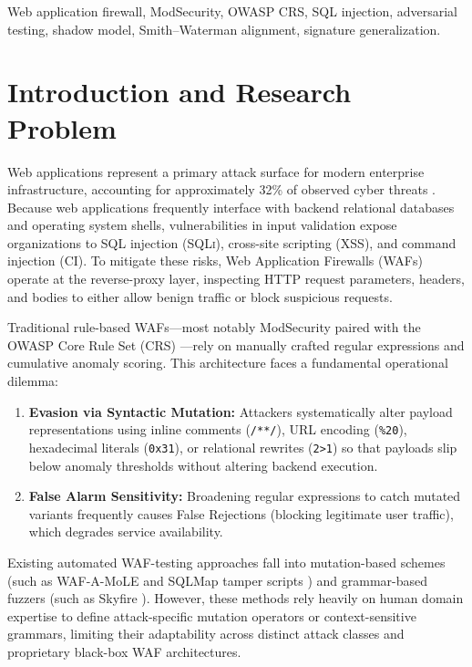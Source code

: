 \documentclass[conference]{IEEEtran}
\newcommand{\WAF}{\textsc{WAF}}
\newcommand{\SQLi}{\textsc{SQLi}}
\newcommand{\XSS}{\textsc{XSS}}
\newcommand{\CI}{\textsc{CI}}
\begin{document}
\begin{IEEEkeywords}
Web application firewall, ModSecurity, OWASP CRS, SQL injection, adversarial testing, shadow model, Smith--Waterman alignment, signature generalization.
\end{IEEEkeywords}

\section{Introduction and Research Problem}
Web applications represent a primary attack surface for modern enterprise infrastructure, accounting for approximately 32\% of observed cyber threats \cite{wu2025}. Because web applications frequently interface with backend relational databases and operating system shells, vulnerabilities in input validation expose organizations to SQL injection (\SQLi{}), cross-site scripting (\XSS{}), and command injection (\CI{}). To mitigate these risks, Web Application Firewalls (\WAF{}s) operate at the reverse-proxy layer, inspecting HTTP request parameters, headers, and bodies to either allow benign traffic or block suspicious requests.

Traditional rule-based \WAF{}s---most notably ModSecurity paired with the OWASP Core Rule Set (CRS) \cite{owaspcrs}---rely on manually crafted regular expressions and cumulative anomaly scoring. This architecture faces a fundamental operational dilemma:
\begin{enumerate}
    \item \textbf{Evasion via Syntactic Mutation:} Attackers systematically alter payload representations using inline comments (\texttt{/**/}), URL encoding (\texttt{\%20}), hexadecimal literals (\texttt{0x31}), or relational rewrites (\texttt{2>1}) so that payloads slip below anomaly thresholds without altering backend execution.
    \item \textbf{False Alarm Sensitivity:} Broadening regular expressions to catch mutated variants frequently causes False Rejections (blocking legitimate user traffic), which degrades service availability.
\end{enumerate}

Existing automated \WAF{}-testing approaches fall into mutation-based schemes (such as WAF-A-MoLE \cite{demetrio2020} and SQLMap tamper scripts \cite{sqlmap}) and grammar-based fuzzers (such as Skyfire \cite{skyfire}). However, these methods rely heavily on human domain expertise to define attack-specific mutation operators or context-sensitive grammars, limiting their adaptability across distinct attack classes and proprietary black-box \WAF{} architectures.
\end{document}
